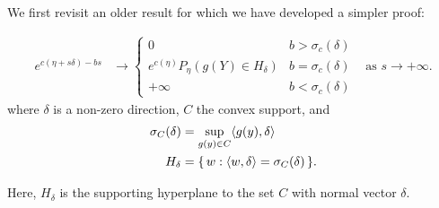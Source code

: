 We first revisit an older result for which we have developed a simpler proof:
\begin{theorem}\label{Thm:e_c}
\begin{align*}
e^{c(\eta + s \delta) - bs} &\to 
		\begin{cases} 
			0 									& b > \sigma_c(\delta) \\
			e^{c(\eta)} P_\eta(g(Y) \in H_\delta ) 	& b = \sigma_c(\delta) \\
			+\infty								& b < \sigma_c(\delta)
		\end{cases}
& \text{as } s \to +\infty.
\end{align*}
where $\delta$ is a non-zero direction, $C$ the convex support, and
\begin{align*}
	\sigma_C (\delta) &= \sup_{g(y) \in C} \langle  g(y), \delta \rangle \\
	H_\delta &= \{\, w: \langle w, \delta \rangle = \sigma_C(\delta)  \,\}.
\end{align*}
\end{theorem}
Here, $H_\delta$ is the supporting hyperplane to the set $C$ with normal vector $\delta$.

